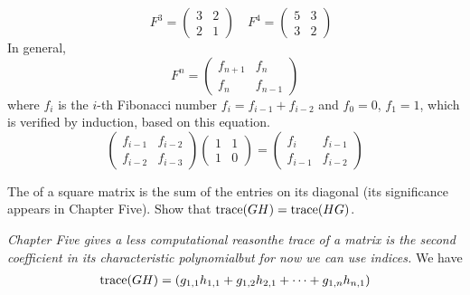 \begin{exercises}
\begin{answer}
\begin{equation*}
        \quad
        F^3=\begin{pmatrix}
          3  &2  \\
          2  &1
        \end{pmatrix}
        \quad
        F^4=\begin{pmatrix}
          5  &3  \\
          3  &2
        \end{pmatrix}
      \end{equation*}
      In general, 
      \begin{equation*}
        F^n=\begin{pmatrix}
          f_{n+1} &f_n  \\
          f_n     &f_{n-1}
        \end{pmatrix}
      \end{equation*}
      where \( f_i \) is the \( i \)-th Fibonacci number
      \( f_i=f_{i-1}+f_{i-2} \) and \( f_0=0 \), \( f_1=1 \), 
      which is verified by induction, based on this equation.
      \begin{equation*}
        \begin{pmatrix}
          f_{i-1}  &f_{i-2} \\
          f_{i-2}  &f_{i-3}
        \end{pmatrix}
        \begin{pmatrix}
          1  &1  \\
          1  &0
        \end{pmatrix}
        =\begin{pmatrix}
           f_i     &f_{i-1}  \\
           f_{i-1} &f_{i-2}
        \end{pmatrix}
      \end{equation*}
    \end{answer}
  \recommended \item
   The  
   of a square matrix is the sum of the
   entries on its diagonal (its significance appears in
   Chapter Five).
   Show that \( \operatorname{trace} (GH)=\operatorname{trace} (HG)  \).
   \begin{answer}
     \textit{Chapter Five gives a less computational reason\Dash the
     trace of a matrix is the second coefficient in its characteristic
     polynomial\Dash but for now we can use indices.}
     We have
     \begin{align*}
       \trace (GH)
       &=(g_{1,1}h_{1,1}+g_{1,2}h_{2,1}+\dots+g_{1,n}h_{n,1})  \\

\end{align*}
\end{answer}
\end{exercises}
